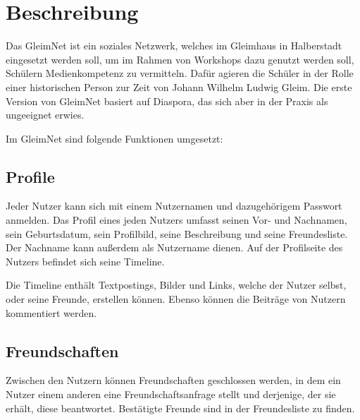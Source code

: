 \documentclass[12pt]{article} %
\begin{document}

\tableofcontents %

\newpage %


\section{Beschreibung} %

Das GleimNet ist ein soziales Netzwerk, welches im Gleimhaus in Halberstadt eingesetzt werden soll, um im Rahmen von Workshops dazu genutzt werden soll, Schülern Medienkompetenz zu vermitteln. Dafür agieren die Schüler in der Rolle einer historischen Person zur Zeit von Johann Wilhelm Ludwig Gleim.
Die erste Version von GleimNet basiert auf Diaspora, das sich aber in der Praxis als ungeeignet erwies.

Im GleimNet sind folgende Funktionen umgesetzt:

\subsection{Profile}

Jeder Nutzer kann sich mit einem Nutzernamen und dazugehörigem  Passwort anmelden. Das Profil eines jeden Nutzers umfasst seinen Vor- und Nachnamen, sein Geburtsdatum, sein Profilbild, seine Beschreibung und seine Freundesliste. Der Nachname kann außerdem als Nutzername dienen. Auf der Profilseite des Nutzers befindet sich seine Timeline.

Die Timeline enthält Textpostings, Bilder und Links, welche der Nutzer selbst, oder seine Freunde, erstellen können. Ebenso können die Beiträge von Nutzern kommentiert werden.

\subsection{Freundschaften}

Zwischen den Nutzern können Freundschaften geschlossen werden, in dem ein Nutzer einem anderen eine Freundschaftsanfrage stellt und derjenige, der sie erhält, diese beantwortet. Bestätigte Freunde sind in der Freundesliste zu finden.
\end{document}
